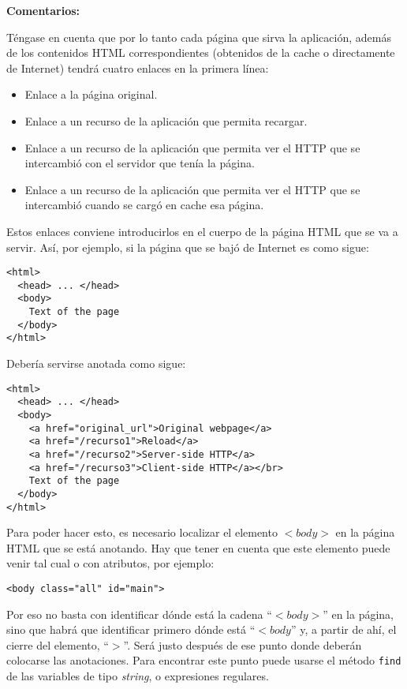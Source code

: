 \textbf{Comentarios:}

Téngase en cuenta que por lo tanto cada página que sirva la aplicación, además de los contenidos  HTML correspondientes (obtenidos de la cache o directamente de Internet) tendrá cuatro enlaces en la primera línea:

\begin{itemize}
\item Enlace a la página original.
\item Enlace a un recurso de la aplicación que permita recargar.
\item Enlace a un recurso de la aplicación que permita ver el HTTP que se intercambió con el servidor que tenía la página.
\item Enlace a un recurso de la aplicación que permita ver el HTTP que se intercambió cuando se cargó en cache esa página.
\end{itemize}

Estos enlaces conviene introducirlos en el cuerpo de la página HTML que se va a servir. Así, por ejemplo, si la página que se bajó de Internet es como sigue:

\begin{verbatim}
<html>
  <head> ... </head>
  <body>
    Text of the page
  </body>
</html>
\end{verbatim}

Debería servirse anotada como sigue:

\begin{verbatim}
<html>
  <head> ... </head>
  <body>
    <a href="original_url">Original webpage</a>
    <a href="/recurso1">Reload</a>
    <a href="/recurso2">Server-side HTTP</a>
    <a href="/recurso3">Client-side HTTP</a></br>
    Text of the page
  </body>
</html>
\end{verbatim}

Para poder hacer esto, es necesario localizar el elemento $<body>$ en la página HTML que se está anotando. Hay que tener en cuenta que este elemento puede venir tal cual o con atributos, por ejemplo:

\begin{verbatim}
<body class="all" id="main">
\end{verbatim}

Por eso no basta con identificar dónde está la cadena ``$<body>$'' en la página, sino que habrá que identificar primero dónde está ``$<body$'' y, a partir de ahí, el cierre del elemento, ``$>$''. Será justo después de ese punto donde deberán colocarse las anotaciones. Para encontrar este punto puede usarse el método \texttt{find} de las variables de tipo \emph{string}, o expresiones regulares.

